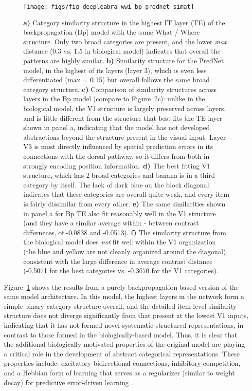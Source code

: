 \documentclass[12pt,twoside]{article}
\newif\myifpdf
\begin{document}
\begin{figure}
  \centering\texttt{[image: figs/fig\_deepleabra\_wwi\_bp\_prednet\_simat]}
  \caption{\small {\bf a)} Category similarity structure in the highest IT layer (TE) of the backpropagation (Bp) model with the same What / Where structure.  Only two broad categories are present, and the lower {\em max} distance (0.3 vs. 1.5 in biological model) indicates that overall the patterns are highly similar.  {\bf b)} Similarity structure for the PredNet model, in the highest of its layers (layer 3), which is even less differentiated (max = 0.15) but overall follows the same broad category structure.  {\bf c)} Comparison of similarity structures across layers in the Bp model (compare to Figure~2c): unlike in the biological model, the V1 structure is largely preserved across layers, and is little different from the structure that best fits the TE layer shown in panel a, indicating that the model has not developed abstractions beyond the structure present in the visual input.  Layer V3 is most directly influenced by spatial prediction errors in its connections with the dorsal pathway, so it differs from both in strongly encoding position information.  {\bf d)} The best fitting V1 structure, which has 2 broad categories and banana is in a third category by itself.  The lack of dark blue on the block diagonal indicates that these categories are overall quite weak, and every item is fairly dissimilar from every other.  {\bf e)} The same similarities shown in panel a for Bp TE also fit reasonably well in the V1 structure (and they have a similar average within - between contrast differneces, of -0.0838 and -0.0513).  {\bf f)} The similarity structure from the biological model does {\em not} fit well within the V1 organization (the blue and yellow are not cleanly organized around the diagonal), consistent with the large difference in average contrast distance (-0.5071 for the best categories vs. -0.3070 for the V1 categories).}
  \label{fig.bpred}
\end{figure}

Figure~\ref{fig.bpred} shows the results from a purely backpropagation-based version of the same model architecture.  In this model, the highest layers in the network form a simple binary category structure overall, and the detailed item-level similarity structure does not diverge significantly from that present at the lowest V1 inputs, indicating that it has not formed novel systematic structured representations, in contrast to those formed in the biologically-based model.  Thus, it is clear that the additional biologically-motivated properties of the original model are playing a critical role in the development of abstract categorical representations. These properties include: excitatory bidirectional connections, inhibitory competition, and a Hebbian form of learning that serves as a regularizer (similar to weight decay)
for predictive error-driven learning \cite{OReilly98,OReillyMunakata00}.
\end{document}
